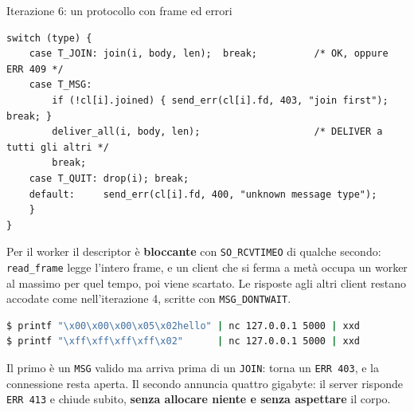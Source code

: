 \begin{esercizio}{Iterazione 6: un protocollo con frame ed errori}
\begin{lstlisting}[language={[POSIX]C}, style=wnumbers, title={chatd.c: il worker legge un frame e risponde}]
    switch (type) {
    case T_JOIN: join(i, body, len);  break;          /* OK, oppure ERR 409 */
    case T_MSG:
        if (!cl[i].joined) { send_err(cl[i].fd, 403, "join first"); break; }
        deliver_all(i, body, len);                    /* DELIVER a tutti gli altri */
        break;
    case T_QUIT: drop(i); break;
    default:     send_err(cl[i].fd, 400, "unknown message type");
    }
}
\end{lstlisting}

Per il worker il descriptor è \textbf{bloccante} con \texttt{SO\_RCVTIMEO} di qualche secondo: \texttt{read\_frame}
legge l'intero frame, e un client che si ferma a metà occupa un worker al massimo per quel tempo, poi viene scartato. Le
risposte agli altri client restano accodate come nell'iterazione 4, scritte con \texttt{MSG\_DONTWAIT}.

\begin{lstlisting}[language=bash, title={Due frame scritti a mano}]
$ printf "\x00\x00\x00\x05\x02hello" | nc 127.0.0.1 5000 | xxd
$ printf "\xff\xff\xff\xff\x02"      | nc 127.0.0.1 5000 | xxd
\end{lstlisting}

Il primo è un \texttt{MSG} valido ma arriva prima di un \texttt{JOIN}: torna un \texttt{ERR 403}, e la connessione resta
aperta. Il secondo annuncia quattro gigabyte: il server risponde \texttt{ERR 413} e chiude subito, \textbf{senza
allocare niente e senza aspettare} il corpo.
\end{esercizio}

